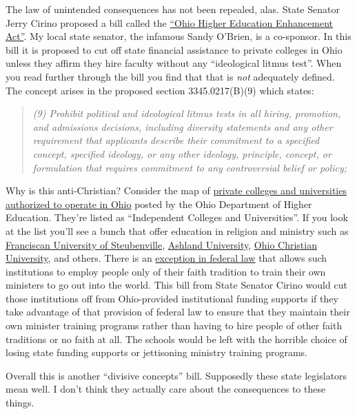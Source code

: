 The law of unintended consequences has not been repealed, alas. State
Senator Jerry Cirino proposed a bill called the
\href{https://www.legislature.ohio.gov/legislation/135/sb83}{``Ohio
Higher Education Enhancement Act''}. My local state senator, the
infamous Sandy O'Brien, is a co-sponsor. In this bill it is proposed to
cut off state financial assistance to private colleges in Ohio unless
they affirm they hire faculty without any ``ideological litmus test''.
When you read further through the bill you find that that is \emph{not}
adequately defined. The concept arises in the proposed section
3345.0217(B)(9) which states:

\begin{quote}
\emph{(9) Prohibit political and ideological litmus tests in all hiring,
promotion, and admissions decisions, including diversity statements and
any other requirement that applicants describe their commitment to a
specified concept, specified ideology, or any other ideology, principle,
concept, or formulation that requires commitment to any controversial
belief or policy;}
\end{quote}

Why is this anti-Christian? Consider the map of
\href{https://highered.ohio.gov/about/ohios-campuses/map}{private
colleges and universities authorized to operate in Ohio} posted by the
Ohio Department of Higher Education. They're listed as ``Independent
Colleges and Universities''. If you look at the list you'll see a bunch
that offer education in religion and ministry such as
\href{https://www.franciscan.edu/}{Franciscan University of
Steubenville}, \href{https://www.ashland.edu/}{Ashland University},
\href{https://www.ohiochristian.edu/}{Ohio Christian University}, and
others. There is an
\href{https://www.eeoc.gov/employers/small-business/hiring-decisions-based-religion}{exception
in federal law} that allows such institutions to employ people only of
their faith tradition to train their own ministers to go out into the
world. This bill from State Senator Cirino would cut those institutions
off from Ohio-provided institutional funding supports if they take
advantage of that provision of federal law to ensure that they maintain
their own minister training programs rather than having to hire people
of other faith traditions or no faith at all. The schools would be left
with the horrible choice of losing state funding supports or jettisoning
ministry training programs.

Overall this is another ``divisive concepts'' bill. Supposedly these
state legislators mean well. I don't think they actually care about the
consequences to these things.
